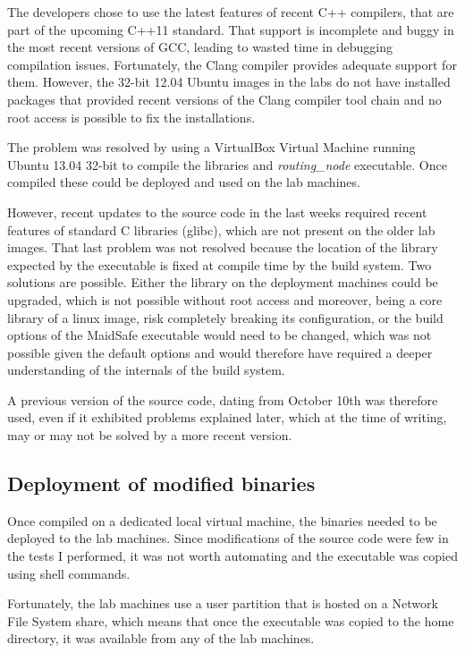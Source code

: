 The developers chose to use the latest features of recent C++ compilers, that are part of the upcoming C++11 standard. That support is incomplete and buggy in the most recent versions of GCC, leading to wasted time in debugging compilation issues. Fortunately, the Clang compiler provides adequate support for them. However, the 32-bit 12.04 Ubuntu images in the labs do not have installed packages that provided recent versions of the Clang compiler tool chain and no root access is possible to fix the installations.

The problem was resolved by using a VirtualBox Virtual Machine running Ubuntu 13.04 32-bit to compile the libraries and \textit{routing\_node} executable. Once compiled these could be deployed and used on the lab machines.

However, recent updates to the source code in the last weeks required recent features of standard C libraries (glibc), which are not present on the older lab images. That last problem was not resolved because the location of the library expected by the executable is fixed at compile time by the build system. Two solutions are possible. Either the library on the deployment machines could be upgraded, which is not possible without root access and moreover, being a core library of a linux image, risk completely breaking its configuration, or the build options of the MaidSafe executable would need to be changed, which was not possible given the default options and would therefore have required a deeper understanding of the internals of the build system. 

A previous version of the source code, dating from October 10th was therefore used, even if it exhibited problems explained later, which at the time of writing, may or may not be solved by a more recent version.

\subsection{Deployment of modified binaries}

Once compiled on a dedicated local virtual machine, the binaries needed to be deployed to the lab machines. Since modifications of the source code were few in the tests I performed, it was not worth automating and the executable was copied using shell commands. 

Fortunately, the lab machines use a user partition that is hosted on a Network File System share, which means that once the executable was copied to the home directory, it was available from any of the lab machines. 

